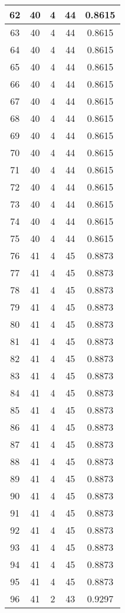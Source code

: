 \documentclass[letterpaper, 12pt]{article}
\begin{document}
\begin{longtable}{|c|c|c|c|c|}
\hline
62 & 40 & 4 & 44 & 0.8615 \\
\hline
63 & 40 & 4 & 44 & 0.8615 \\
\hline
64 & 40 & 4 & 44 & 0.8615 \\
\hline
65 & 40 & 4 & 44 & 0.8615 \\
\hline
66 & 40 & 4 & 44 & 0.8615 \\
\hline
67 & 40 & 4 & 44 & 0.8615 \\
\hline
68 & 40 & 4 & 44 & 0.8615 \\
\hline
69 & 40 & 4 & 44 & 0.8615 \\
\hline
70 & 40 & 4 & 44 & 0.8615 \\
\hline
71 & 40 & 4 & 44 & 0.8615 \\
\hline
72 & 40 & 4 & 44 & 0.8615 \\
\hline
73 & 40 & 4 & 44 & 0.8615 \\
\hline
74 & 40 & 4 & 44 & 0.8615 \\
\hline
75 & 40 & 4 & 44 & 0.8615 \\
\hline
76 & 41 & 4 & 45 & 0.8873 \\
\hline
77 & 41 & 4 & 45 & 0.8873 \\
\hline
78 & 41 & 4 & 45 & 0.8873 \\
\hline
79 & 41 & 4 & 45 & 0.8873 \\
\hline
80 & 41 & 4 & 45 & 0.8873 \\
\hline
81 & 41 & 4 & 45 & 0.8873 \\
\hline
82 & 41 & 4 & 45 & 0.8873 \\
\hline
83 & 41 & 4 & 45 & 0.8873 \\
\hline
84 & 41 & 4 & 45 & 0.8873 \\
\hline
85 & 41 & 4 & 45 & 0.8873 \\
\hline
86 & 41 & 4 & 45 & 0.8873 \\
\hline
87 & 41 & 4 & 45 & 0.8873 \\
\hline
88 & 41 & 4 & 45 & 0.8873 \\
\hline
89 & 41 & 4 & 45 & 0.8873 \\
\hline
90 & 41 & 4 & 45 & 0.8873 \\
\hline
91 & 41 & 4 & 45 & 0.8873 \\
\hline
92 & 41 & 4 & 45 & 0.8873 \\
\hline
93 & 41 & 4 & 45 & 0.8873 \\
\hline
94 & 41 & 4 & 45 & 0.8873 \\
\hline
95 & 41 & 4 & 45 & 0.8873 \\
\hline
96 & 41 & 2 & 43 & 0.9297 \\

\end{longtable}
\end{document}
